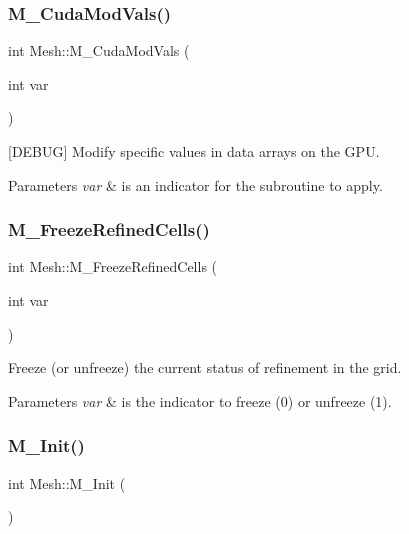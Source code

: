 \subsubsection{\texorpdfstring{M\+\_\+\+Cuda\+Mod\+Vals()}{M\_CudaModVals()}}
{\footnotesize\ttfamily int Mesh\+::\+M\+\_\+\+Cuda\+Mod\+Vals (\begin{DoxyParamCaption}\item[{int}]{var }\end{DoxyParamCaption})}



\mbox{[}D\+E\+B\+UG\mbox{]} Modify specific values in data arrays on the G\+PU. 


\begin{DoxyParams}{Parameters}
{\em var} & is an indicator for the subroutine to apply. \\
\hline
\end{DoxyParams}
\mbox{\label{classMesh_a6350653aaf7e0115ebc8e47f97bde421}} 
\subsubsection{\texorpdfstring{M\+\_\+\+Freeze\+Refined\+Cells()}{M\_FreezeRefinedCells()}}
{\footnotesize\ttfamily int Mesh\+::\+M\+\_\+\+Freeze\+Refined\+Cells (\begin{DoxyParamCaption}\item[{int}]{var }\end{DoxyParamCaption})}



Freeze (or unfreeze) the current status of refinement in the grid. 


\begin{DoxyParams}{Parameters}
{\em var} & is the indicator to freeze (0) or unfreeze (1). \\
\hline
\end{DoxyParams}
\mbox{\label{classMesh_a2260b774a142e91c4712bd92774ca258}} 
\subsubsection{\texorpdfstring{M\+\_\+\+Init()}{M\_Init()}}
{\footnotesize\ttfamily int Mesh\+::\+M\+\_\+\+Init (\begin{DoxyParamCaption}{ }\end{DoxyParamCaption})\hspace{0.3cm}{\ttfamily [private]}}



